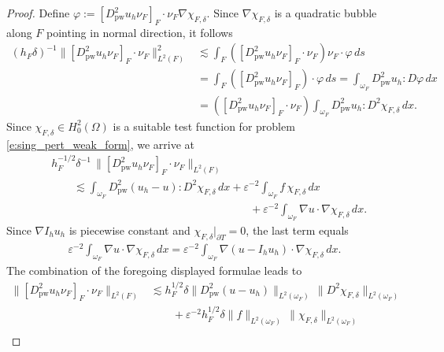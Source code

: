 \documentclass[a4paper]{amsart}
\theoremstyle{definition}
\numberwithin{equation}{section}
\numberwithin{theorem}{section}
\newcommand{\pw}{\mathrm{pw}}
\begin{document}
\begin{proof}
    Define $\varphi:=[D^2_\pw u_h\nu_F]_F\cdot\nu_F 
    \nabla \chi_{F,\delta}$.
    Since $\nabla \chi_{F,\delta}$ is a quadratic bubble 
    along $F$ pointing in normal direction, it follows 
    \begin{align*}
        (h_F\delta)^{-1}
           \lVert [D^2_\pw u_h\nu_F]_F\cdot\nu_F\rVert_{L^2(F)}^2
        &\lesssim 
          \int_F ([D^2_\pw u_h\nu_F]_F\cdot\nu_F) \nu_F\cdot \varphi\,ds \\
        &= \int_F ([D^2_\pw u_h\nu_F]_F)\cdot \varphi\,ds 
        = \int_{\omega_F} D_\pw^2 u_h:D\varphi\,dx\\
        &= ([D^2_\pw u_h\nu_F]_F\cdot\nu_F) 
           \int_{\omega_F} D_\pw^2 u_h:D^2\chi_{F,\delta}\,dx.
    \end{align*}
    Since $\chi_{F,\delta}\in H^2_0(\Omega)$ 
    is a suitable test function for problem \eqref{e:sing_pert_weak_form},
    we arrive at
    \begin{align*}
        & h_F^{-1/2}\delta^{-1} \, 
           \lVert [D^2_\pw u_h\nu_F]_F\cdot\nu_F\rVert_{L^2(F)}\\
        &\qquad 
        \lesssim 
             \int_{\omega_F} D_\pw^2 (u_h-u):D^2\chi_{F,\delta}\,dx
           + \varepsilon^{-2} \int_{\omega_F} f \,\chi_{F,\delta}\,dx\\
        &\qquad \qquad \qquad \qquad \qquad \qquad \qquad \qquad \qquad 
           + \varepsilon^{-2}
             \int_{\omega_F} \nabla u\cdot \nabla \chi_{F,\delta}\,dx.
    \end{align*}
    Since $\nabla I_h u_h$ is piecewise constant and 
    $\chi_{F,\delta}\vert_{\partial T}=0$, 
    the last term equals 
    \begin{align*}
        \varepsilon^{-2}\int_{\omega_F} \nabla u\cdot \nabla \chi_{F,\delta}\,dx
        = \varepsilon^{-2}\int_{\omega_F} \nabla (u-I_h u_h) \cdot 
              \nabla \chi_{F,\delta}\,dx.
    \end{align*}
    The combination of the foregoing displayed formulae 
    leads to 
    \begin{align*}
        \lVert [D_\pw^2 u_h\nu_F]_F\cdot\nu_F\rVert_{L^2(F)}
        &
        \lesssim 
          h_F^{1/2} \delta
          \lVert D_\pw^2(u-u_h)\rVert_{L^2(\omega_F)}\, 
             \lVert D^2\chi_{F,\delta}\rVert_{L^2(\omega_F)}\\
        &\qquad
         + \varepsilon^{-2}h_F^{1/2} \delta
           \lVert f\rVert_{L^2(\omega_F)} \,
             \lVert\chi_{F,\delta}\rVert_{L^2(\omega_F)}\\

\end{align*}
\end{proof}
\end{document}
